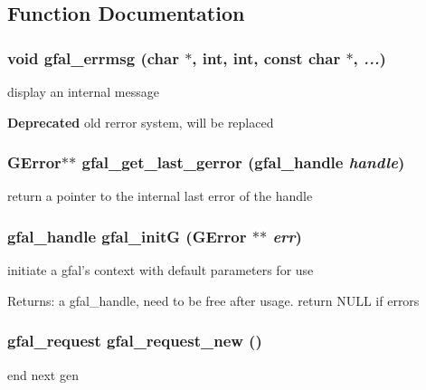 \subsection{Function Documentation}
\subsubsection{\setlength{\rightskip}{0pt plus 5cm}void gfal\_\-errmsg (char $\ast$, int, int, const char $\ast$,  {\em ...})}\label{gfal__common_8h_53a1e14d422fda082f71f520468b79b3}


display an internal message 

\begin{Desc}
\item[\bf{Deprecated}]old rerror system, will be replaced \end{Desc}
\subsubsection{\setlength{\rightskip}{0pt plus 5cm}GError$\ast$$\ast$ gfal\_\-get\_\-last\_\-gerror (gfal\_\-handle {\em handle})}\label{gfal__common_8h_5db6cc7aef8f56e6b1b69f903d9c5411}


return a pointer to the internal last error of the handle 
\subsubsection{\setlength{\rightskip}{0pt plus 5cm}gfal\_\-handle gfal\_\-init\-G (GError $\ast$$\ast$ {\em err})}\label{gfal__common_8h_8410ba458f920d8f8a8f0e5594170fe4}


initiate a gfal's context with default parameters for use \begin{Desc}
\item[Returns:]a gfal\_\-handle, need to be free after usage. return NULL if errors \end{Desc}
\subsubsection{\setlength{\rightskip}{0pt plus 5cm}gfal\_\-request gfal\_\-request\_\-new ()}\label{gfal__common_8h_b5d503849656335232e56583b376ee22}


end next gen 